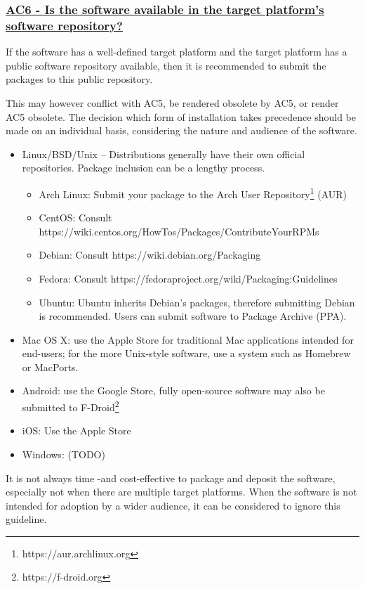 \documentclass[a4paper,11pt]{article}
\newcommand{\criterion}[2]{\subsubsection*{\underline{#1 - #2}}\label{id:#1}}
\begin{document}
\newcommand{\acSixID}{AC6}
\newcommand{\acSixText}{Is the software available in the target platform's software repository?}
\criterion{\acSixID}{\acSixText}

If the software has a well-defined target platform and the target platform has
a public software repository available, then it is recommended to submit the
packages to this public repository.

This may however conflict with AC5, be rendered obsolete by AC5, or render AC5
obsolete. The decision which form of installation takes precedence should be
made on an individual basis, considering the nature and audience of the
software.

\begin{itemize}
    \item Linux/BSD/Unix -- Distributions generally have their own official repositories. Package inclusion can be a lengthy process.
    \begin{itemize}
        \item Arch Linux: Submit your package to the Arch User Repository\footnote{https://aur.archlinux.org} (AUR)
		\item CentOS: Consult https://wiki.centos.org/HowTos/Packages/ContributeYourRPMs
        \item Debian: Consult https://wiki.debian.org/Packaging
        \item Fedora: Consult https://fedoraproject.org/wiki/Packaging:Guidelines
        \item Ubuntu: Ubuntu inherits Debian's packages, therefore submitting Debian is recommended. Users can submit software  to Package Archive (PPA).
    \end{itemize}
    \item Mac OS X: use the Apple Store for traditional Mac applications intended for end-users; for the more Unix-style
        software, use a system such as Homebrew or MacPorts.
    \item Android: use the Google Store, fully open-source software may also be submitted to F-Droid\footnote{https://f-droid.org}
    \item iOS: Use the Apple Store
    \item Windows: (TODO) 
\end{itemize}

It is not always time -and cost-effective to package and deposit the software,
especially not when there are multiple target platforms. When the software is
not intended for adoption by a wider audience, it can be considered to ignore
this guideline.
\end{document}
